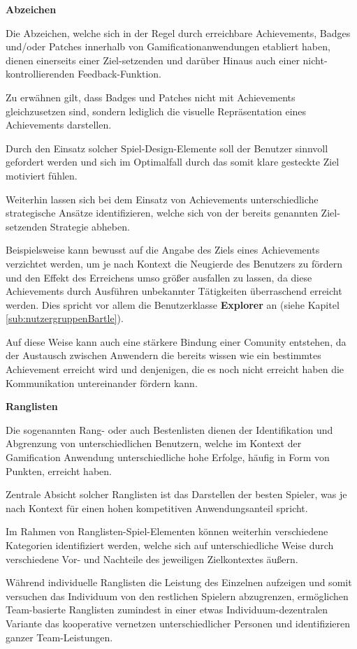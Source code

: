 \documentclass[bibliography=totoc,listof=totoc,BCOR=5mm,DIV=12,oneside]{scrbook}
\begin{document}
\par \bigskip \textbf{Abzeichen}
\par Die Abzeichen, welche sich in der Regel durch erreichbare Achievements, Badges und/oder Patches innerhalb von Gamificationanwendungen etabliert haben, dienen einerseits einer Ziel-setzenden und darüber Hinaus auch einer nicht-kontrollierenden Feedback-Funktion. 
\par Zu erwähnen gilt, dass Badges und Patches nicht mit Achievements gleichzusetzen sind, sondern lediglich die visuelle Repräsentation eines Achievements darstellen.
\par Durch den Einsatz solcher Spiel-Design-Elemente soll der Benutzer sinnvoll gefordert werden und sich im Optimalfall durch das somit klare gesteckte Ziel motiviert fühlen.
\par \medskip Weiterhin lassen sich bei dem Einsatz von Achievements unterschiedliche strategische Ansätze identifizieren, welche sich von der bereits genannten Ziel-setzenden Strategie abheben. 
\par Beispielsweise kann bewusst auf die Angabe des Ziels eines Achievements verzichtet werden, um je nach Kontext die Neugierde des Benutzers zu fördern und den Effekt des Erreichens umso größer ausfallen zu lassen, da diese Achievements durch Ausführen unbekannter Tätigkeiten überraschend erreicht werden. Dies spricht vor allem die Benutzerklasse \textbf{Explorer} an (siehe Kapitel \ref{sub:nutzergruppenBartle}). 
\par Auf diese Weise kann auch eine stärkere Bindung einer Comunity entstehen, da der Austausch zwischen Anwendern die bereits wissen wie ein bestimmtes Achievement erreicht wird und denjenigen, die es noch nicht erreicht haben die Kommunikation untereinander fördern kann.

\par \bigskip \textbf{Ranglisten}
\par Die sogenannten Rang- oder auch Bestenlisten dienen der Identifikation und Abgrenzung von unterschiedlichen Benutzern, welche im Kontext der Gamification Anwendung unterschiedliche hohe Erfolge, häufig in Form von Punkten, erreicht haben.
\par Zentrale Absicht solcher Ranglisten ist das Darstellen der besten Spieler, was je nach Kontext für einen hohen kompetitiven Anwendungsanteil spricht.

\par \medskip Im Rahmen von Ranglisten-Spiel-Elementen können weiterhin verschiedene Kategorien identifiziert werden, welche sich auf unterschiedliche Weise durch verschiedene Vor- und Nachteile des jeweiligen Zielkontextes äußern.
\par Während individuelle Ranglisten die Leistung des Einzelnen aufzeigen und somit versuchen das Individuum von den restlichen Spielern abzugrenzen, ermöglichen Team-basierte Ranglisten zumindest in einer etwas Individuum-dezentralen Variante das kooperative vernetzen unterschiedlicher Personen und identifizieren ganzer Team-Leistungen.
\end{document}
